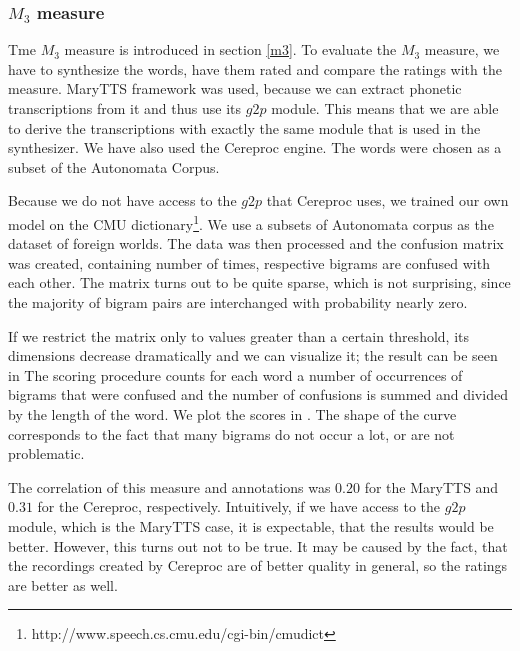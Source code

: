 \subsubsection{$M_3$ measure}
Tme $M_3$ measure is introduced in section \ref{m3}.
To evaluate the $M_3$ measure, we have to synthesize the words, have them rated and compare the ratings with the measure.
MaryTTS framework was used, because we can extract phonetic transcriptions from it and thus use its $g2p$ module.
This means that we are able to derive the transcriptions with exactly the same module that is used in the synthesizer.
We have also used the Cereproc engine.
The words were chosen as a subset of the Autonomata Corpus.
\par
Because we do not have access to the $g2p$ that Cereproc uses, we trained our own model on the CMU dictionary\footnote{http://www.speech.cs.cmu.edu/cgi-bin/cmudict}.
We use a subsets of Autonomata corpus as the dataset of foreign worlds.
The data was then processed and the confusion matrix was created, containing number of times, respective bigrams are confused with each other.
The matrix turns out to be quite sparse, which is not surprising, since the majority of bigram pairs are interchanged with probability nearly zero.
\par
If we restrict the matrix only to values greater than a certain threshold, its dimensions decrease dramatically and we can visualize it; the result can be seen in 
The scoring procedure counts for each word a number of occurrences of bigrams that were confused and the number of confusions is summed and divided by the length of the word.
We plot the scores in .
The shape of the curve corresponds to the fact that many bigrams do not occur a lot, or are not problematic.
\par
The correlation of this measure and annotations was $0.20$ for the MaryTTS and $0.31$ for the Cereproc, respectively.
Intuitively, if we have access to the $g2p$ module, which is the MaryTTS case, it is expectable, that the results would be better.
However, this turns out not to be true.
It may be caused by the fact, that the recordings created by Cereproc are of better quality in general, so the ratings are better as well.
